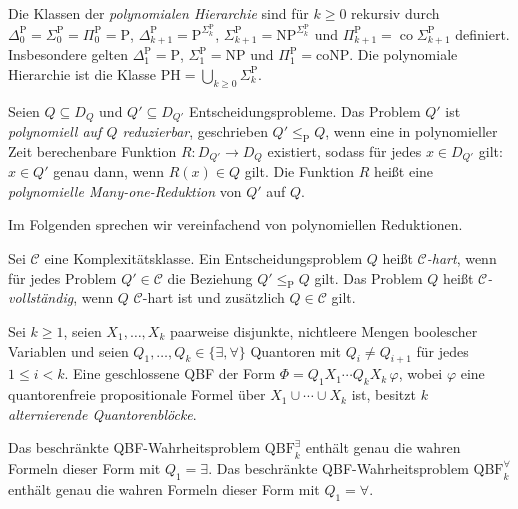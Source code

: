 \begin{Definition}
    \label{def:polynomial-hierarchy}
    Die Klassen der \emph{polynomialen Hierarchie} sind für
    \(k\geq 0\) rekursiv durch
    \(\Delta_0^{\mathrm{P}}=\Sigma_0^{\mathrm{P}}
    =\Pi_0^{\mathrm{P}}=\mathrm{P}\),
    \(\Delta_{k+1}^{\mathrm{P}}
    =\mathrm{P}^{\Sigma_k^{\mathrm{P}}}\),
    \(\Sigma_{k+1}^{\mathrm{P}}
    =\mathrm{NP}^{\Sigma_k^{\mathrm{P}}}\) und
    \(\Pi_{k+1}^{\mathrm{P}}
    =\operatorname{co}\Sigma_{k+1}^{\mathrm{P}}\) definiert.
    Insbesondere gelten
    \(\Delta_1^{\mathrm{P}}=\mathrm{P}\),
    \(\Sigma_1^{\mathrm{P}}=\mathrm{NP}\) und
    \(\Pi_1^{\mathrm{P}}=\mathrm{coNP}\).
    Die polynomiale Hierarchie ist die Klasse
    \(\mathrm{PH}=\bigcup_{k\geq 0}\Sigma_k^{\mathrm{P}}\).
\end{Definition}

\begin{Definition}
    \label{def:polynomial-reduction}
    Seien \(Q\subseteq D_Q\) und \(Q'\subseteq D_{Q'}\)
    Entscheidungsprobleme. Das Problem \(Q'\) ist
    \emph{polynomiell auf \(Q\) reduzierbar}, geschrieben
    \(Q'\leq_{\mathrm{P}}Q\), wenn eine in polynomieller Zeit
    berechenbare Funktion \(R\colon D_{Q'}\to D_Q\) existiert, sodass
    für jedes \(x\in D_{Q'}\) gilt:
    \(x\in Q'\) genau dann, wenn \(R(x)\in Q\) gilt. Die Funktion \(R\)
    heißt eine \emph{polynomielle Many-one-Reduktion} von \(Q'\) auf
    \(Q\).
\end{Definition}
Im Folgenden sprechen wir vereinfachend von polynomiellen Reduktionen. 

\begin{Definition}
    \label{def:hardness-completeness}
    Sei \(\mathcal{C}\) eine Komplexitätsklasse. Ein
    Entscheidungsproblem \(Q\) heißt \emph{\(\mathcal{C}\)-hart}, wenn
    für jedes Problem \(Q'\in\mathcal{C}\) die Beziehung
    \(Q'\leq_{\mathrm{P}}Q\) gilt. Das Problem \(Q\) heißt
    \emph{\(\mathcal{C}\)-vollständig}, wenn \(Q\)
    \(\mathcal{C}\)-hart ist und zusätzlich \(Q\in\mathcal{C}\) gilt.
\end{Definition}

\begin{Definition}
    \label{def:bounded-qbf-truth}
    Sei \(k\geq 1\), seien \(X_1,\dots,X_k\) paarweise disjunkte,
    nichtleere Mengen boolescher Variablen und seien
    \(Q_1,\dots,Q_k\in\{\exists,\forall\}\) Quantoren mit
    \(Q_i\neq Q_{i+1}\) für jedes \(1\leq i<k\). Eine geschlossene QBF
    der Form
    \(\Phi=Q_1X_1\cdots Q_kX_k\,\varphi\), wobei \(\varphi\) eine
    quantorenfreie propositionale Formel über
    \(X_1\cup\cdots\cup X_k\) ist, besitzt \(k\)
    \emph{alternierende Quantorenblöcke}.

    Das beschränkte QBF-Wahrheitsproblem
    \(\mathrm{QBF}^{\exists}_k\) enthält genau die wahren Formeln dieser
    Form mit \(Q_1=\exists\). Das beschränkte QBF-Wahrheitsproblem
    \(\mathrm{QBF}^{\forall}_k\) enthält genau die wahren Formeln dieser
    Form mit \(Q_1=\forall\).
\end{Definition}

